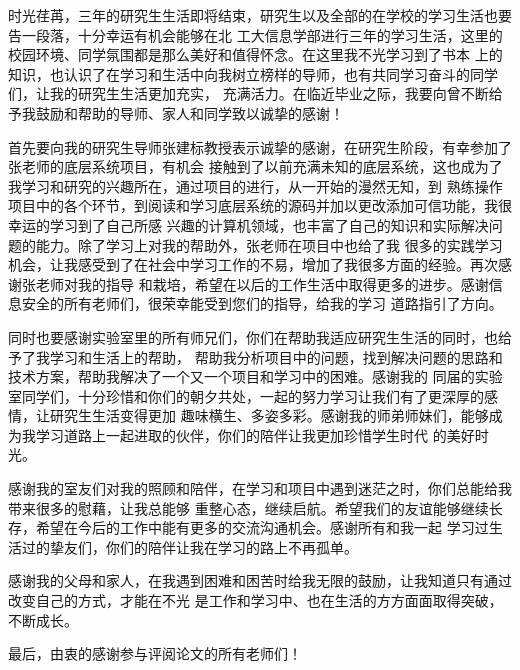 \begin{acknowledgement}

时光荏苒，三年的研究生生活即将结束，研究生以及全部的在学校的学习生活也要告一段落，十分幸运有机会能够在北
工大信息学部进行三年的学习生活，这里的校园环境、同学氛围都是那么美好和值得怀念。在这里我不光学习到了书本
上的知识，也认识了在学习和生活中向我树立榜样的导师，也有共同学习奋斗的同学们，让我的研究生生活更加充实，
充满活力。在临近毕业之际，我要向曾不断给予我鼓励和帮助的导师、家人和同学致以诚挚的感谢！
\par 首先要向我的研究生导师张建标教授表示诚挚的感谢，在研究生阶段，有幸参加了张老师的底层系统项目，有机会
接触到了以前充满未知的底层系统，这也成为了我学习和研究的兴趣所在，通过项目的进行，从一开始的漫然无知，到
熟练操作项目中的各个环节，到阅读和学习底层系统的源码并加以更改添加可信功能，我很幸运的学习到了自己所感
兴趣的计算机领域，也丰富了自己的知识和实际解决问题的能力。除了学习上对我的帮助外，张老师在项目中也给了我
很多的实践学习机会，让我感受到了在社会中学习工作的不易，增加了我很多方面的经验。再次感谢张老师对我的指导
和栽培，希望在以后的工作生活中取得更多的进步。感谢信息安全的所有老师们，很荣幸能受到您们的指导，给我的学习
道路指引了方向。
\par 同时也要感谢实验室里的所有师兄们，你们在帮助我适应研究生生活的同时，也给予了我学习和生活上的帮助，
帮助我分析项目中的问题，找到解决问题的思路和技术方案，帮助我解决了一个又一个项目和学习中的困难。感谢我的
同届的实验室同学们，十分珍惜和你们的朝夕共处，一起的努力学习让我们有了更深厚的感情，让研究生生活变得更加
趣味横生、多姿多彩。感谢我的师弟师妹们，能够成为我学习道路上一起进取的伙伴，你们的陪伴让我更加珍惜学生时代
的美好时光。
\par 感谢我的室友们对我的照顾和陪伴，在学习和项目中遇到迷茫之时，你们总能给我带来很多的慰藉，让我总能够
重整心态，继续启航。希望我们的友谊能够继续长存，希望在今后的工作中能有更多的交流沟通机会。感谢所有和我一起
学习过生活过的挚友们，你们的陪伴让我在学习的路上不再孤单。
\par 感谢我的父母和家人，在我遇到困难和困苦时给我无限的鼓励，让我知道只有通过改变自己的方式，才能在不光
是工作和学习中、也在生活的方方面面取得突破，不断成长。
\par 最后，由衷的感谢参与评阅论文的所有老师们！



\end{acknowledgement}

